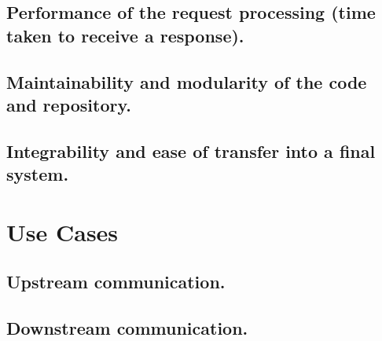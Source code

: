 \documentclass{article}
\begin{document}
\subsection{Performance of the request processing (time taken to receive a response).}

\subsection{Maintainability and modularity of the code and repository.}

\subsection{Integrability and ease of transfer into a final system.}


\section{Use Cases}

\subsection{Upstream communication.}

\subsection{Downstream communication.}
\end{document}
